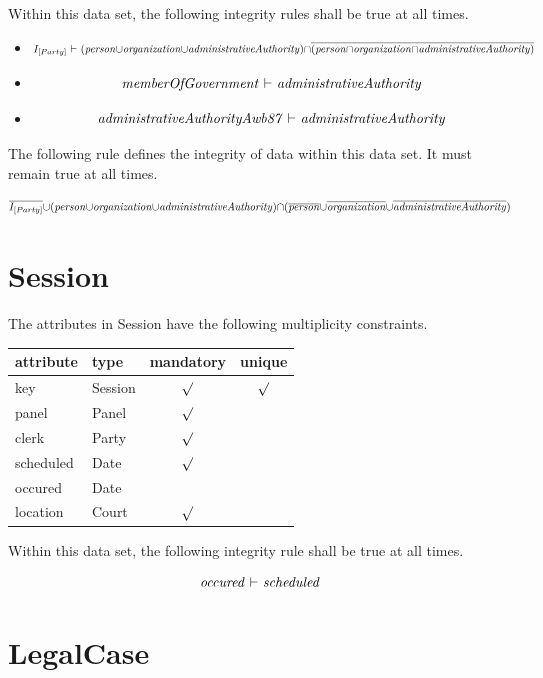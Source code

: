 \documentclass[10pt,a4paper]{report}              %
\theoremstyle{plain}\theorembodyfont{\rmfamily}\newtheorem{definition}{Definition}[section]
\theoremstyle{plain}\theorembodyfont{\rmfamily}\newtheorem{designrule}[definition]{Requirement}
\def\id#1{\mbox{\em #1\/}}
\newcommand{\cmpl}[1]{\overline{#1}}
\begin{document}
Within this data set, the following integrity rules shall be true at all times. 

\begin{itemize}
\item
  \[I_{[Party]}\ {\vdash}\ ({\id{person}}{\cup}{\id{organization}}{\cup}{\id{administrativeAuthority}}){\cap}\cmpl{({\id{person}}{\cap}{\id{organization}}{\cap}{\id{administrativeAuthority}})}\]
\item
  \[{\id{memberOfGovernment}}\ {\vdash}\ {\id{administrativeAuthority}}\]
\item
  \[{\id{administrativeAuthorityAwb87}}\ {\vdash}\ {\id{administrativeAuthority}}\]
\end{itemize}
The following rule defines the integrity of data within this data set. It must remain true at all times. 

\[\cmpl{I_{[Party]}}{\cup}({\id{person}}{\cup}{\id{organization}}{\cup}{\id{administrativeAuthority}}){\cap}(\cmpl{{\id{person}}}{\cup}\cmpl{{\id{organization}}}{\cup}\cmpl{{\id{administrativeAuthority}}})\]

\section{Session}

\label{sct:plug Session}

The attributes in Session have the following multiplicity constraints. 

\begin{center}
\begin{tabular}{llcc}
attribute & type & mandatory & unique\\
\hline
key  & Session & $\surd$ & $\surd$\\
panel & Panel & $\surd$ & \\
clerk & Party & $\surd$ & \\
scheduled & Date & $\surd$ & \\
occured & Date &  & \\
location & Court & $\surd$ & \\
\end{tabular}
\end{center}

Within this data set, the following integrity rule shall be true at all times. 

\[{\id{occured}}\ {\vdash}\ {\id{scheduled}}\]

\section{LegalCase}
\end{document}
